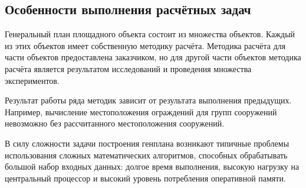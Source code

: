 \subsection{\Large{Особенности выполнения расчётных задач}}

Генеральный план площадного объекта состоит из множества объектов.
Каждый из этих объектов имеет собственную методику расчёта.
Методика расчёта для части объектов предоставлена заказчиком,
но для другой части объектов методика расчёта
является результатом исследований и проведения множества экспериментов.

Результат работы ряда методик зависит от результата выполнения предыдущих.
Например, вычисление местоположения ограждений для групп сооружений невозможно без рассчитанного
местоположения сооружений.

В силу сложности задачи построения генплана
возникают типичные проблемы использования сложных математических алгоритмов,
способных обрабатывать большой набор входных данных: долгое время выполнения,
высокую нагрузку на центральный процессор и высокий уровень потребления оперативной памяти.
